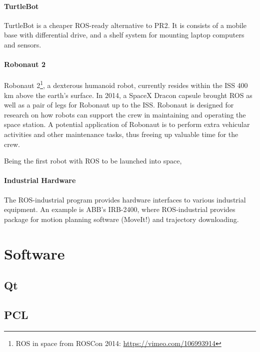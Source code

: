 \paragraph{TurtleBot} 

TurtleBot is a cheaper ROS-ready alternative to PR2. It is consists of a mobile base with differential drive, and a shelf system for mounting laptop computers and sensors.

\paragraph{Robonaut 2}

Robonaut 2\footnote{\ac{ROS} in space from ROSCon 2014: \url{https://vimeo.com/106993914}}, a dexterous humanoid robot, currently resides within the \ac{ISS} 400 km above the earth's surface. In 2014, a SpaceX Dracon capsule brought \ac{ROS} as well as a pair of legs for Robonaut up to the \ac{ISS}\cite{ROS_space}. Robonaut is designed for research on how robots can support the crew in maintaining and operating the space station. A potential application of Robonaut is to perform extra vehicular activities and other maintenance tasks, thus freeing up valuable time for the crew.

Being the first robot with \ac{ROS} to be launched into space, 

\paragraph{Industrial Hardware}

The ROS-industrial program\cite{ROS_industrial} provides hardware interfaces to various industrial equipment. An example is ABB's IRB-2400, where \ac{ROS}-industrial provides package for motion planning software (MoveIt!) and trajectory downloading\cite{ROS_industria_hardware}. 

\section{Software}

\subsection{Qt}

\subsection{PCL}


